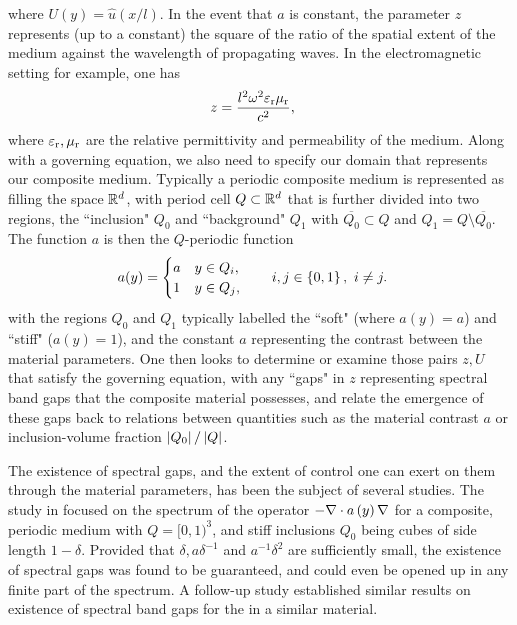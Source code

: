 where $U(y)=\hat{u}(x/l)$.
In the event that $a$ is constant, the parameter $z$ represents (up to a constant) the square of the ratio of the spatial extent of the medium against the wavelength of propagating waves.
In the electromagnetic setting for example, one has
\begin{align*}
	z &= \frac{l^2 \omega^2 \varepsilon_\mathrm{r}\mu_{\mathrm{r}}}{c^2},
\end{align*}
where $\varepsilon_\mathrm{r},\mu_{\mathrm{r}}$ are the relative permittivity and permeability of the medium.
Along with a governing equation, we also need to specify our domain that represents our composite medium.
Typically a periodic composite medium is represented as filling the space $\mathbb{R}^d$, with period cell $Q\subset\mathbb{R}^d$ that is further divided into two regions, the ``inclusion" $Q_0$ and ``background" $Q_1$ with $\overline{Q_0}\subset Q$ and $Q_1=Q\setminus\overline{Q_0}$.
The function $a$ is then the $Q$-periodic function
\begin{align*}
	a(y) &= \begin{cases} a & y\in Q_i, \\ 1 & y\in Q_j, \end{cases}
	\qquad i,j\in\left\{ 0,1 \right\}, \ i\neq j.
\end{align*}
with the regions $Q_0$ and $Q_1$ typically labelled the ``soft" (where $a(y)=a$) and ``stiff" ($a(y)=1$), and the constant $a$ representing the contrast between the material parameters.
One then looks to determine or examine those pairs $z, U$ that satisfy the governing equation, with any ``gaps" in $z$ representing spectral band gaps that the composite material possesses, and relate the emergence of these gaps back to relations between quantities such as the material contrast $a$ or inclusion-volume fraction $\left\lvert Q_0 \right\rvert/\left\lvert Q \right\rvert$.

The existence of spectral gaps, and the extent of control one can exert on them through the material parameters, has been the subject of several studies.
The study in  focused on the spectrum of the operator $-\nabla\cdot a\left( y \right)\nabla$ for a composite, periodic medium with $Q=[0,1)^3$, and stiff inclusions $Q_0$ being cubes of side length $1-\delta$.
Provided that $\delta, a\delta^{-1}$ and $a^{-1}\delta^2$ are sufficiently small, the existence of spectral gaps was found to be guaranteed, and could even be opened up in any finite part of the spectrum.
A follow-up study  established similar results on existence of spectral band gaps for the  in a similar material.
